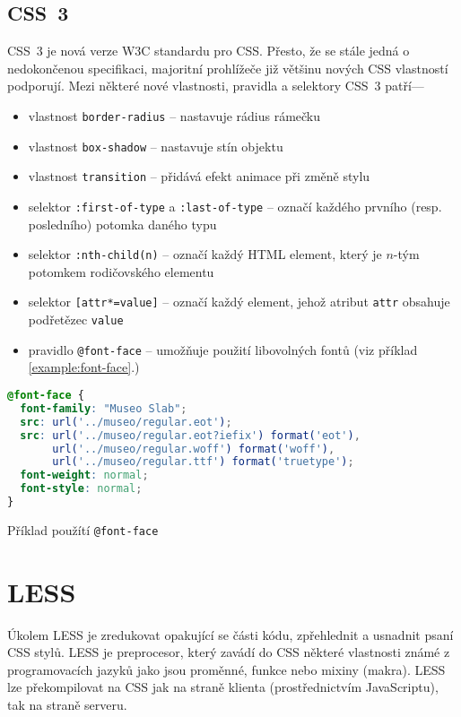 \subsection{CSS~3}

CSS~3 je nová verze W3C standardu pro CSS. Přesto, že se stále jedná o nedokončenou specifikaci, majoritní prohlížeče již většinu nových CSS vlastností podporují. Mezi některé nové vlastnosti, pravidla a selektory CSS~3 patří---

\begin{itemize}
    \item vlastnost \texttt{border-radius} -- nastavuje rádius rámečku
    \item vlastnost \texttt{box-shadow} -- nastavuje stín objektu
    \item vlastnost \texttt{transition} -- přidává efekt animace při změně stylu
    \item selektor \texttt{:first-of-type} a \texttt{:last-of-type} -- označí každého prvního (resp. posledního) potomka daného typu
    \item selektor \texttt{:nth-child(n)} -- označí každý HTML element, který je $n$-tým potomkem rodičovského elementu
    \item selektor \texttt{[attr*=value]} -- označí každý element, jehož atribut \texttt{attr} obsahuje podřetězec \texttt{value}
    \item pravidlo \texttt{@font-face} -- umožňuje použití libovolných fontů (viz příklad \ref{example:font-face}.)
\end{itemize}

\begin{example}
    \centering
    \begin{lstlisting}[language=css]
@font-face {
  font-family: "Museo Slab";
  src: url('../museo/regular.eot');
  src: url('../museo/regular.eot?iefix') format('eot'),
       url('../museo/regular.woff') format('woff'),
       url('../museo/regular.ttf') format('truetype');
  font-weight: normal;
  font-style: normal;
}
    \end{lstlisting}
    \caption{Příklad použítí \texttt{@font-face}}
    \label{example:font-face}
\end{example}

\section{LESS}
\label{sec:less}

Úkolem LESS je zredukovat opakující se části kódu, zpřehlednit a usnadnit psaní CSS stylů. LESS je preprocesor, který zavádí do CSS některé vlastnosti známé z programovacích jazyků jako jsou proměnné, funkce nebo mixiny (makra). LESS lze překompilovat na CSS jak na straně klienta (prostřednictvím JavaScriptu), tak na straně serveru.

